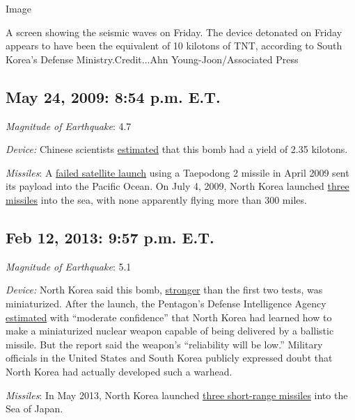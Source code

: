 Image

A screen showing the seismic waves on Friday. The device detonated on
Friday appears to have been the equivalent of 10 kilotons of TNT,
according to South Korea's Defense Ministry.Credit...Ahn
Young-Joon/Associated Press

\hypertarget{may-24-2009-854-pm-et}{%
\subsection{May 24, 2009: 8:54 p.m. E.T.}\label{may-24-2009-854-pm-et}}

\emph{Magnitude of Earthquake}: 4.7

\emph{Device:} Chinese scientists
\href{http://www.bssaonline.org/content/102/2/467.abstract?sid=7c769220-2dfc-45b2-96d7-73fef9aa8d48}{estimated}
that this bomb had a yield of 2.35 kilotons.

\emph{Missiles}: A
\href{http://www.nytimes.com/2009/04/06/world/asia/06korea.html}{failed
satellite launch} using a Taepodong 2 missile in April 2009 sent its
payload into the Pacific Ocean. On July 4, 2009, North Korea launched
\href{http://www.nytimes.com/2009/07/04/world/asia/04korea.html}{three
missiles} into the sea, with none apparently flying more than 300 miles.

\hypertarget{feb-12-2013-957-pm-et}{%
\subsection{Feb 12, 2013: 9:57 p.m. E.T.}\label{feb-12-2013-957-pm-et}}

\emph{Magnitude of Earthquake}: 5.1

\emph{Device:} North Korea said this bomb,
\href{http://www.ctbto.org/press-centre/press-releases/2013/ctbto-detects-radioactivity-consistent-with-12-february-announced-north-korean-nuclear-test/}{stronger}
than the first two tests, was miniaturized. After the launch, the
Pentagon's Defense Intelligence Agency
\href{http://www.nytimes.com/2013/04/12/world/asia/north-korea-may-have-nuclear-missile-capability-us-agency-says.html}{estimated}
with ``moderate confidence'' that North Korea had learned how to make a
miniaturized nuclear weapon capable of being delivered by a ballistic
missile. But the report said the weapon's ``reliability will be low.''
Military officials in the United States and South Korea publicly
expressed doubt that North Korea had actually developed such a warhead.

\emph{Missiles}: In May 2013, North Korea launched
\href{http://www.nytimes.com/2013/05/19/world/asia/north-korea-missiles.html}{three
short-range missiles} into the Sea of Japan.

